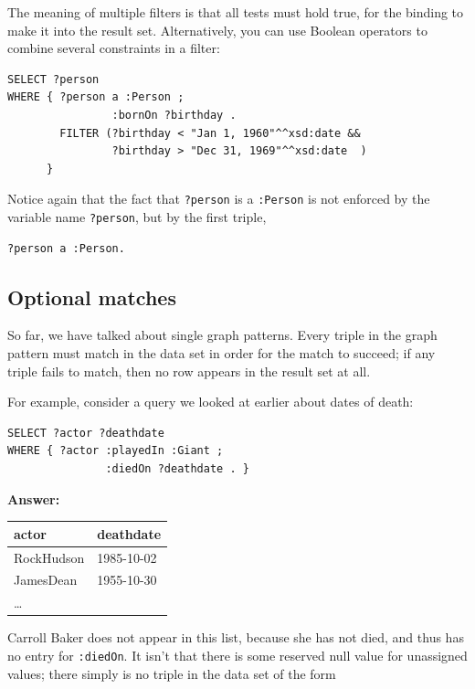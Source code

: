 The meaning of multiple filters is that all tests must hold true, for
the binding to make it into the result set. Alternatively, you can use
Boolean operators to combine several constraints in a filter:

\begin{lstlisting}
SELECT ?person
WHERE { ?person a :Person ;
                :bornOn ?birthday .
        FILTER (?birthday < "Jan 1, 1960"^^xsd:date &&
                ?birthday > "Dec 31, 1969"^^xsd:date  )
      }
\end{lstlisting}

Notice again that the fact that \texttt{?person} is a \texttt{:Person} is not enforced by
the variable name \texttt{?person}, but by the first triple,

\begin{lstlisting}
?person a :Person.
\end{lstlisting}

\subsection{Optional matches}

So far, we have talked about single graph patterns. Every triple in the
graph pattern must match in the data set in order for the match to
succeed; if any triple fails to match, then no row appears in the result
set at all.

For example, consider a query we looked at earlier about dates of death:



\begin{lstlisting}
SELECT ?actor ?deathdate
WHERE { ?actor :playedIn :Giant ;
               :diedOn ?deathdate . }
\end{lstlisting}

\textbf{\textbf{Answer:}}

\begin{tabular}{|ll|}
\hline
actor&deathdate\\
\hline
RockHudson&1985-10-02\\
JamesDean&1955-10-30\\
\ldots\\
\hline
\end{tabular}


Carroll Baker does not appear in this list, because she has not died,
and thus has no entry for \texttt{:diedOn}. It isn't that there is some reserved
null value for unassigned values; there simply is no triple in the data
set of the form

